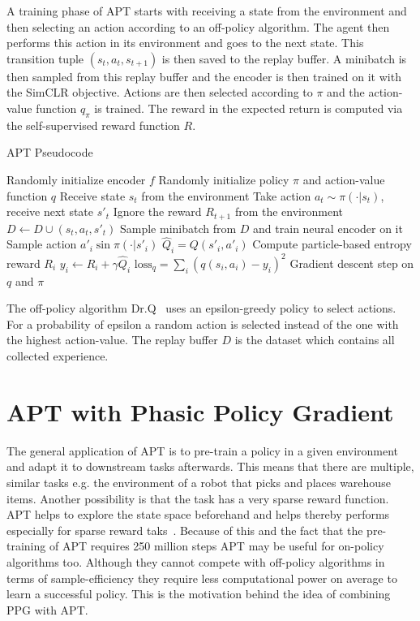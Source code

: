 \documentclass{article}
\begin{document}
\noindent A training phase of APT starts with receiving a state from the environment and then selecting an action
according to an off-policy algorithm. 
The agent then performs this action in its environment and goes to the next state.
This transition tuple $(s_t, a_t, s_{t+1})$ is then saved to the replay buffer.
A minibatch is then sampled from this replay buffer and the encoder is then trained on it with the SimCLR objective.
Actions are then selected according to $\pi$ and the action-value function $q_\pi$ is trained. 
The reward in the expected return is computed via the self-supervised reward function $R$.\\

\begin{algorithm}[h]
\begin{algorithmic}[1]
\caption{APT Pseudocode}
\State Randomly initialize encoder $f$
\State Randomly initialize policy $\pi$ and action-value function $q$
        \State Receive state $s_t$ from the environment
        \State Take action $a_t \sim \pi(\cdot|s_t)$, receive next state $s'_t$
        \State Ignore the reward $R_{t+1}$ from the environment
        \State $D \gets D \cup (s_t, a_t, s'_t)$
        \State Sample minibatch from $D$ and train neural encoder on it
            \State Sample action ${a'}_i \sin \pi(\cdot|s'_i)$
            \State $\hat Q_i = Q(s'_i, a'_i)$
            \State Compute particle-based entropy reward $R_i$
            \State $y_i \gets R_i + \gamma \hat Q_i$
        \EndFor
        \State $\text{loss}_q = \sum_i (q(s_i, a_i) - y_i)^2$
        \State Gradient descent step on $q$ and $\pi$
    \EndFor
\EndFor
\end{algorithmic}
\end{algorithm}

\noindent The off-policy algorithm Dr.Q~\cite{DBLP:journals/corr/abs-2004-13649} uses an epsilon-greedy
policy to select actions. For a probability of epsilon
a random action is selected instead of the one with the highest action-value.
The replay buffer $D$ is the dataset which contains all collected experience.

\section{APT with Phasic Policy Gradient}
The general application of APT is to pre-train a policy in a given environment and adapt it
to downstream tasks afterwards. This means that there are multiple, similar tasks e.g.
the environment of a robot that picks and places warehouse items. Another possibility is
that the task has a very sparse reward function. APT helps to explore the state space beforehand
and helps thereby performs especially for sparse reward taks~\cite{DBLP:journals/corr/abs-2103-04551}.
Because of this and the fact that the pre-training of APT requires 250 million steps 
APT may be useful for on-policy algorithms too. Although they cannot compete
with off-policy algorithms in terms of sample-efficiency they require less computational
power on average to learn a successful policy. 
This is the motivation behind the idea of combining PPG with APT.\\
\end{document}
